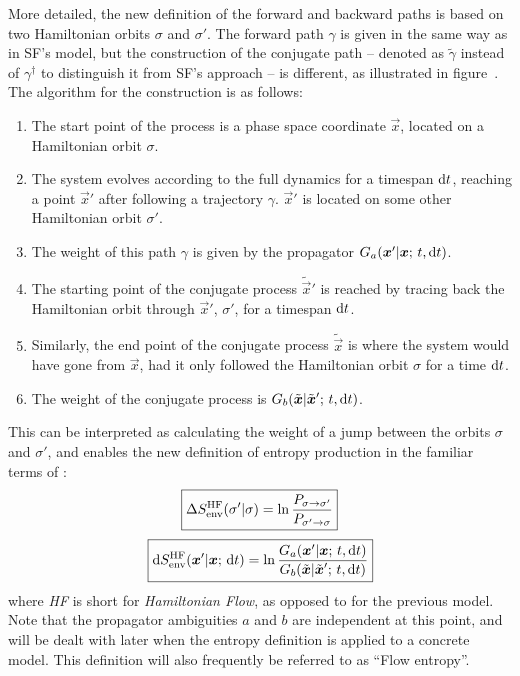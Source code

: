 More detailed, the new definition of the forward and backward paths is based on two Hamiltonian orbits \(\sigma\) and \(\sigma'\). The forward path \(\gamma\) is given in the same way as in SF's model, but the construction of the conjugate path -- denoted as \(\tilde\gamma\) instead of \(\gamma^\dagger\) to distinguish it from SF's approach -- is different, as illustrated in figure~. The algorithm for the construction is as follows:
%
\begin{enumerate}
	\item The start point of the process is a phase space coordinate \(\vec x\), located on a Hamiltonian orbit \(\sigma\).
	\item The system evolves according to the full dynamics for a timespan \(\mathrm{d} t\), reaching a point \(\vec x'\) after following a trajectory \(\gamma\). \(\vec x'\) is located on some other Hamiltonian orbit \(\sigma'\).
	\item The weight of this path \(\gamma\) is given by the propagator \(G_a(\boldsymbol{x}'|\boldsymbol{x};\,t,\mathrm{d} t)\).
	\item The starting point of the conjugate process \(\tilde{\vec x}'\) is reached by tracing back the Hamiltonian orbit through \(\vec x'\), \(\sigma'\), for a timespan \(\mathrm{d} t\).
	\item Similarly, the end point of the conjugate process \(\tilde{\vec x}\) is where the system would have gone from \(\vec x\), had it only followed the Hamiltonian orbit \(\sigma\) for a time \(\mathrm{d} t\).
	\item The weight of the conjugate process is \(G_b(\tilde{\boldsymbol{x}}|\tilde{\boldsymbol{x}}';\,t,\mathrm{d} t)\).
\end{enumerate}
%
This can be interpreted as calculating the weight of a jump between the orbits \(\sigma\) and \(\sigma'\), and enables the new definition of entropy production in the familiar terms of :
%
\begin{equation}
	\boxed{
	\Delta S_\text{env}^{\text{HF}}(\sigma'|\sigma)
	= \ln\frac{P_{\sigma\to\sigma'}}{P_{\sigma'\to\sigma}}
	}
\end{equation}
%
\begin{equation}
	\label{eqn:orbitentropy}
	\boxed{
	\mathrm{d}S_\text{env}^{\text{HF}}(\boldsymbol{x}'|\boldsymbol{x};\,\mathrm{d} t)
	= \ln\frac{G_a(\boldsymbol{x}'|\boldsymbol{x};\,t,\mathrm{d} t)}{G_b(\tilde{\boldsymbol{x}}|\tilde{\boldsymbol{x}}';\,t,\mathrm{d} t)}
	}
\end{equation}
%
where \emph{HF} is short for \emph{Hamiltonian Flow}, as opposed to \SF{} for the previous model. Note that the propagator ambiguities \(a\) and \(b\) are independent at this point, and will be dealt with later when the entropy definition is applied to a concrete model. This definition will also frequently be referred to as ``Flow entropy''.
%



